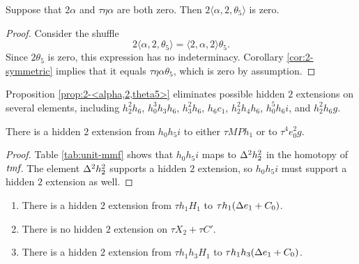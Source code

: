 \begin{prop}
\label{prop:2-<alpha,2,theta5>}
Suppose that $2 \alpha$ and $\tau \eta \alpha$ are both zero.
Then $2 \langle \alpha, 2, \theta_5 \rangle$ is zero.
\end{prop}

\begin{proof}
Consider the shuffle
\[
2 \langle \alpha, 2, \theta_5 \rangle =
\langle 2, \alpha, 2 \rangle \theta_5.
\]
Since $2 \theta_5$ is zero, this expression has no indeterminacy.
Corollary \ref{cor:2-symmetric} implies that it equals
$\tau \eta \alpha \theta_5$, which is zero by assumption.
\end{proof}

\begin{remark}
\label{rem:2-<alpha,2,theta5>}
Proposition \ref{prop:2-<alpha,2,theta5>} eliminates possible
hidden $2$ extensions on several elements, including $h_2^2 h_6$,
$h_0^3 h_3 h_6$, $h_3^2 h_6$, $h_6 c_1$, $h_2^2 h_4 h_6$,
$h_0^5 h_6 i$, and $h_2^2 h_6 g$.
\end{remark}



\begin{lemma}
\label{lem:2-h0h5i}
There is a hidden $2$ extension from $h_0 h_5 i$ to either
$\tau M P h_1$ or to $\tau^4 e_0^2 g$.
\end{lemma}

\begin{proof}
Table \ref{tab:unit-mmf} shows that
$h_0 h_5 i$ maps to $\Delta^2 h_2^2$ in the homotopy of $\textit{tmf}$.
The element $\Delta^2 h_2^2$ supports a hidden $2$ extension,
so $h_0 h_5 i$ must support a hidden $2$ extension as well.
\end{proof}

\begin{lemma}
\label{lem:2-th1H1}
\mbox{}
\begin{enumerate}
\item
{}
There is a hidden $2$ extension from
$\tau h_1 H_1$ to $\tau h_1 (\Delta e_1 + C_0)$.
\item
{}
There is no hidden $2$ extension on $\tau X_2 + \tau C'$.
\item
{}
There is a hidden $2$ extension from
$\tau h_1 h_3 H_1$ to $\tau h_1 h_3 (\Delta e_1 + C_0)$.
\end{enumerate}
\end{lemma}

